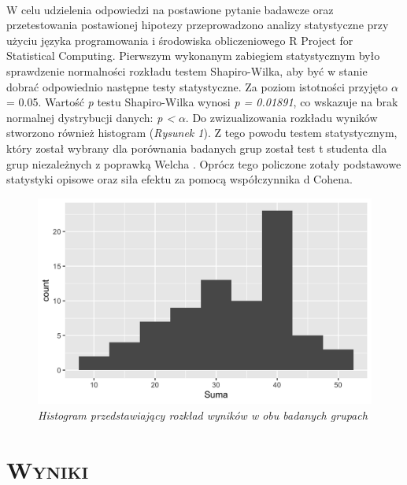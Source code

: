 \documentclass[12pt,a4paper,final,oneside,onecolumn,titlepage]{article}
\begin{document}
\paragraph{}
W celu udzielenia odpowiedzi na postawione pytanie badawcze oraz przetestowania postawionej hipotezy przeprowadzono analizy statystyczne przy użyciu języka programowania i środowiska obliczeniowego R Project for Statistical Computing. Pierwszym wykonanym zabiegiem statystycznym było sprawdzenie normalności rozkładu testem Shapiro-Wilka, aby być w stanie dobrać odpowiednio następne testy statystyczne. Za poziom istotności przyjęto $\alpha$ = 0.05. Wartość \textit{p} testu Shapiro-Wilka wynosi \textit{p = 0.01891}, co wskazuje na brak normalnej dystrybucji danych: \textit{p <} $\alpha$. Do zwizualizowania rozkładu wyników stworzono również histogram (\textit{Rysunek 1}). Z tego powodu testem statystycznym, który został wybrany dla porównania badanych grup został test t studenta dla grup niezależnych z poprawką Welcha \citep{welch_generalization_1947}. Oprócz tego policzone zotały podstawowe statystyki opisowe oraz siła efektu za pomocą współczynnika d Cohena.
\begin{figure}[h!]
\caption{\textit{Histogram przedstawiający rozkład wyników w obu badanych grupach}}
\centering
\includegraphics[scale=0.2]{histogram_all}
\end{figure}
\section*{\large{\textbf{\textsc{Wyniki}}}}
\end{document}
